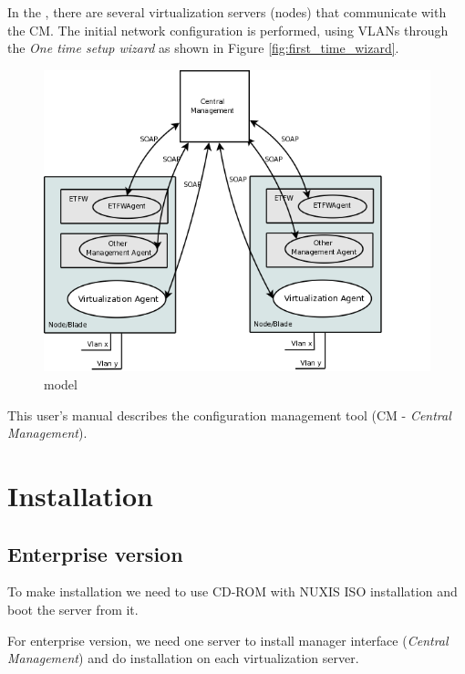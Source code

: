 In the \acronym, there are several virtualization servers (nodes) that communicate with the CM. The initial network configuration is performed, using VLANs through the \emph{One time setup wizard} as shown in Figure \ref{fig:first_time_wizard}.

\begin{figure}[H]
    \begin{center}
	\includegraphics[scale=0.6]{screenshots/etva_enterprise.png}
	\caption{\acronym model}
	\label{fig:etva_enterprise}
	\end{center}
\end{figure}

This user's manual describes the configuration management tool (CM - \emph{Central Management}). 

\pagebreak
\chapter{\textsf{Installation}}
\label{chp:installation}
\section{Enterprise version}

To make installation we need to use CD-ROM with NUXIS ISO installation and boot the server from it.

For enterprise version, we need one server to install manager interface (\emph{Central Management}) and do installation on each virtualization server.

